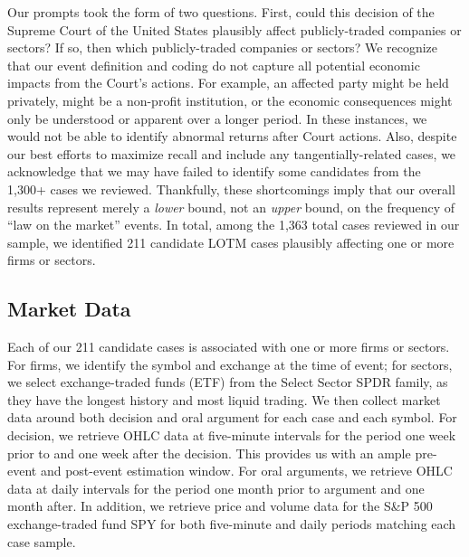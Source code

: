 \documentclass[preprint,12pt]{elsarticle}
\begin{document}
Our prompts took the form of two questions.  First, could this decision of the Supreme Court of the United States plausibly affect publicly-traded companies or sectors?  If so, then which publicly-traded companies or sectors?  We recognize that our event definition and coding do not capture all potential economic impacts from the Court's actions.  For example, an affected party might be held privately, might be a non-profit institution, or the economic consequences might only be understood or apparent over a longer period.  In these instances, we would not be able to identify abnormal returns after Court actions. Also, despite our best efforts to maximize recall and include any tangentially-related cases, we acknowledge that we may have failed to identify some candidates from the 1,300+ cases we reviewed.  Thankfully, these shortcomings imply that our overall results represent merely a \textit{lower} bound, not an \textit{upper} bound, on the frequency of ``law on the market'' events.  In total, among the 1,363 total cases reviewed in our sample, we identified 211 candidate LOTM cases plausibly affecting one or more firms or sectors.

\subsection{Market Data}
Each of our 211 candidate cases is associated with one or more firms or sectors.  For firms, we identify the symbol and exchange at the time of event; for sectors, we select exchange-traded funds (ETF) from the Select Sector SPDR family, as they have the longest history and most liquid trading.  We then collect market data around both decision and oral argument for each case and each symbol.  For decision, we retrieve OHLC data at five-minute intervals for the period one week prior to and one week after the decision.  This provides us with an ample pre-event and post-event estimation window.  For oral arguments, we retrieve OHLC data at daily intervals for the period one month prior to argument and one month after.  In addition, we retrieve price and volume data for the S\&P 500 exchange-traded fund \textsc{SPY} for both five-minute and daily periods matching each case sample.
\end{document}
